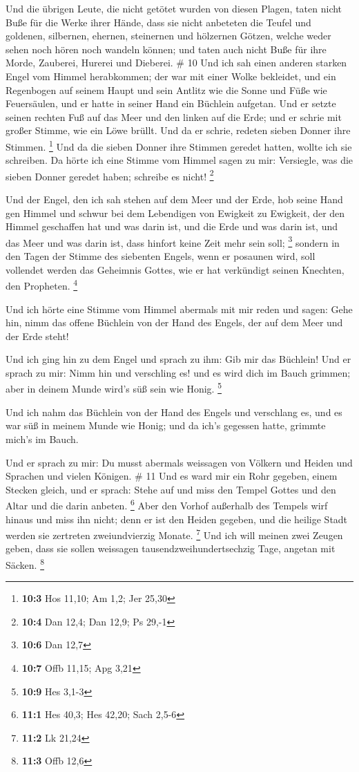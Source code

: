  Und die übrigen Leute, die nicht getötet wurden von
diesen Plagen, taten nicht Buße für die Werke ihrer Hände, dass sie
nicht anbeteten die Teufel und goldenen, silbernen, ehernen, steinernen
und hölzernen Götzen, welche weder sehen noch hören noch wandeln können;
 und taten auch nicht Buße für ihre Morde, Zauberei,
Hurerei und Dieberei. \# 10  Und ich sah einen anderen
starken Engel vom Himmel herabkommen; der war mit einer Wolke bekleidet,
und ein Regenbogen auf seinem Haupt und sein Antlitz wie die Sonne und
Füße wie Feuersäulen,  und er hatte in seiner Hand ein
Büchlein aufgetan. Und er setzte seinen rechten Fuß auf das Meer und den
linken auf die Erde;  und er schrie mit großer Stimme, wie
ein Löwe brüllt. Und da er schrie, redeten sieben Donner ihre Stimmen.
\footnote{\textbf{10:3} Hos 11,10; Am 1,2; Jer 25,30}  Und
da die sieben Donner ihre Stimmen geredet hatten, wollte ich sie
schreiben. Da hörte ich eine Stimme vom Himmel sagen zu mir: Versiegle,
was die sieben Donner geredet haben; schreibe es nicht! \footnote{\textbf{10:4}
  Dan 12,4; Dan 12,9; Ps 29,-1}

 Und der Engel, den ich sah stehen auf dem Meer und der
Erde, hob seine Hand gen Himmel  und schwur bei dem
Lebendigen von Ewigkeit zu Ewigkeit, der den Himmel geschaffen hat und
was darin ist, und die Erde und was darin ist, und das Meer und was
darin ist, dass hinfort keine Zeit mehr sein soll; \footnote{\textbf{10:6}
  Dan 12,7}  sondern in den Tagen der Stimme des siebenten
Engels, wenn er posaunen wird, soll vollendet werden das Geheimnis
Gottes, wie er hat verkündigt seinen Knechten, den Propheten.
\footnote{\textbf{10:7} Offb 11,15; Apg 3,21}

 Und ich hörte eine Stimme vom Himmel abermals mit mir
reden und sagen: Gehe hin, nimm das offene Büchlein von der Hand des
Engels, der auf dem Meer und der Erde steht!

 Und ich ging hin zu dem Engel und sprach zu ihm: Gib mir
das Büchlein! Und er sprach zu mir: Nimm hin und verschling es! und es
wird dich im Bauch grimmen; aber in deinem Munde wird's süß sein wie
Honig. \footnote{\textbf{10:9} Hes 3,1-3}

 Und ich nahm das Büchlein von der Hand des Engels und
verschlang es, und es war süß in meinem Munde wie Honig; und da ich's
gegessen hatte, grimmte mich's im Bauch.

 Und er sprach zu mir: Du musst abermals weissagen von
Völkern und Heiden und Sprachen und vielen Königen. \# 11 
Und es ward mir ein Rohr gegeben, einem Stecken gleich, und er sprach:
Stehe auf und miss den Tempel Gottes und den Altar und die darin
anbeten. \footnote{\textbf{11:1} Hes 40,3; Hes 42,20; Sach 2,5-6}
 Aber den Vorhof außerhalb des Tempels wirf hinaus und
miss ihn nicht; denn er ist den Heiden gegeben, und die heilige Stadt
werden sie zertreten zweiundvierzig Monate. \footnote{\textbf{11:2} Lk
  21,24}  Und ich will meinen zwei Zeugen geben, dass sie
sollen weissagen tausendzweihundertsechzig Tage, angetan mit Säcken.
\footnote{\textbf{11:3} Offb 12,6}

